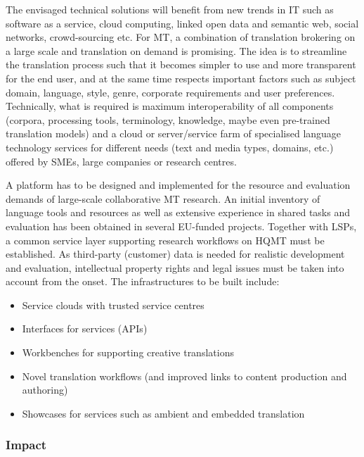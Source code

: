 \documentclass[10pt, plain]{../../metanetpaper}
\begin{document}
\begin{multicols}{2}
The envisaged technical solutions will benefit from new trends in IT such as software as a service, cloud  computing, linked open data and semantic web, social networks, crowd-sourcing etc. For MT, a combination of translation brokering on a large scale and translation on demand is promising. The idea is to streamline the translation process such that it becomes simpler to use and more transparent for the end user, and at the same time respects important factors such as subject domain, language, style, genre, corporate requirements and user preferences. Technically, what is required is maximum interoperability of all components (corpora, processing tools, terminology, knowledge, maybe even pre-trained translation models) and a cloud or server/service farm of specialised language technology services for different needs (text and media types, domains, etc.) offered by SMEs, large companies or research centres.
 
A platform has to be designed and implemented for the resource and evaluation demands of large-scale collaborative MT research. An initial inventory of language tools and resources as well as extensive experience in shared tasks and evaluation has been obtained in several EU-funded projects.
Together with LSPs, a common service layer supporting research workflows on HQMT must be established. As third-party (customer) data is needed for realistic development and evaluation, intellectual property rights and legal issues must be taken into account from the onset. The infrastructures to be built include:

\begin{itemize}
\item Service clouds with trusted service centres
\item Interfaces for services (APIs)
\item Workbenches for supporting creative translations
\item Novel translation workflows (and improved links to content production and authoring)
\item Showcases for services such as ambient and embedded translation
\end{itemize}

\subsubsection{Impact}
\label{sec:impact-pt1}


\end{multicols}
\end{document}
